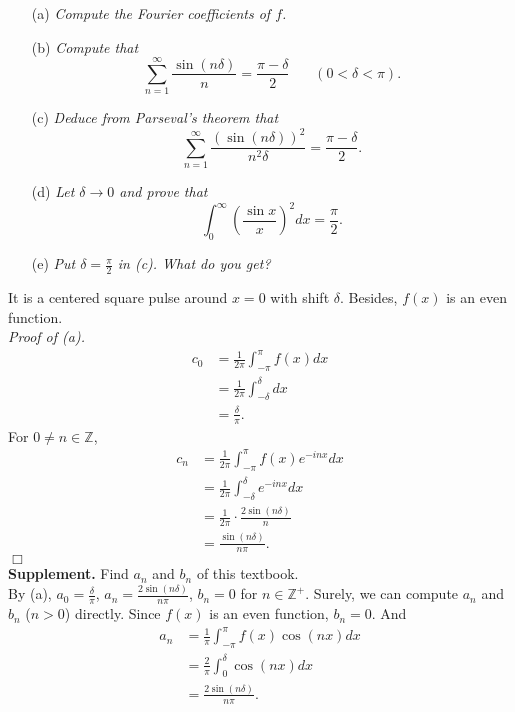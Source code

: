 \documentclass{article}
\begin{document}
\begin{enumerate}
\item[(a)]
\emph{Compute the Fourier coefficients of $f$.}

\item[(b)]
\emph{Compute that
$$\sum_{n = 1}^{\infty} \frac{\sin(n\delta)}{n} = \frac{\pi - \delta}{2}
\:\:\:\:\:\:\:\:
(0 < \delta < \pi).$$}

\item[(c)]
\emph{Deduce from Parseval's theorem that
$$\sum_{n = 1}^{\infty} \frac{(\sin(n\delta))^2}{n^2 \delta} = \frac{\pi - \delta}{2}.$$}

\item[(d)]
\emph{Let $\delta \rightarrow 0$ and prove that
$$\int_{0}^{\infty} \left( \frac{\sin x}{x} \right)^2 dx
= \frac{\pi}{2}.$$}

\item[(e)]
\emph{Put $\delta = \frac{\pi}{2}$ in (c). What do you get?} \\
\end{enumerate}

It is a centered square pulse around $x = 0$ with shift $\delta$.
Besides, $f(x)$ is an even function. \\

\emph{Proof of (a).}
\begin{align*}
c_0
&= \frac{1}{2 \pi} \int_{-\pi}^\pi f(x) dx \\
&= \frac{1}{2 \pi} \int_{-\delta}^\delta dx \\
&= \frac{\delta}{\pi}.
\end{align*}
For $0 \neq n \in \mathbb{Z}$,
\begin{align*}
c_n
&= \frac{1}{2 \pi} \int_{-\pi}^\pi f(x) e^{-inx} dx \\
&= \frac{1}{2 \pi} \int_{-\delta}^\delta e^{-inx} dx \\
&= \frac{1}{2 \pi} \cdot \frac{2 \sin(n \delta)}{n} \\
&= \frac{\sin(n \delta)}{n \pi}.
\end{align*}
$\Box$ \\

\textbf{Supplement.} Find $a_n$ and $b_n$ of this textbook. \\
By (a), $a_0 = \frac{\delta}{\pi}$,
$a_n = \frac{2 \sin(n \delta)}{n \pi}$, $b_n = 0$ for $n \in \mathbb{Z}^+$.
Surely, we can compute $a_n$ and $b_n$ ($n > 0$) directly.
Since $f(x)$ is an even function, $b_n = 0$.
And
\begin{align*}
a_n
&= \frac{1}{\pi} \int_{-\pi}^\pi f(x) \cos(nx) dx \\
&= \frac{2}{\pi} \int_{0}^\delta \cos(nx) dx \\
&= \frac{2 \sin(n \delta)}{n \pi}.
\end{align*}
\end{document}
